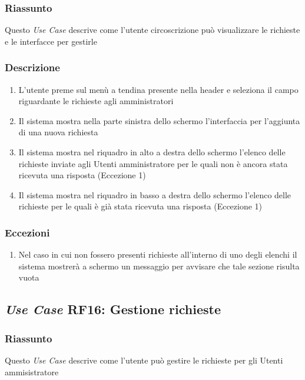         \subsubsection{Riassunto}
            Questo \textit{Use Case} descrive come l'utente circoscrizione può visualizzare le richieste e le interfacce per gestirle
        \subsubsection{Descrizione}
            \begin{enumerate}
                \item L'utente preme sul menù a tendina presente nella header e seleziona il campo riguardante le richieste agli amministratori
                \item Il sistema mostra nella parte sinistra dello schermo l'interfaccia per l'aggiunta di una nuova richiesta
                \item Il sistema mostra nel riquadro in alto a destra dello schermo l'elenco delle richieste inviate agli Utenti amministratore per le quali non è ancora stata ricevuta una risposta (Eccezione 1)
                \item Il sistema mostra nel riquadro in basso a destra dello schermo l'elenco delle richieste per le quali è già stata ricevuta una risposta (Eccezione 1)
            \end{enumerate}
        \subsubsection{Eccezioni}
            \begin{enumerate}
                \item Nel caso in cui non fossero presenti richieste all'interno di uno degli elenchi il sistema mostrerà a schermo un messaggio per avvisare che tale sezione risulta vuota
            \end{enumerate}

    \subsection{\textit{Use Case} RF16: Gestione richieste}
        \subsubsection{Riassunto}
            Questo \textit{Use Case} descrive come l'utente può gestire le richieste per gli Utenti ammisistratore
